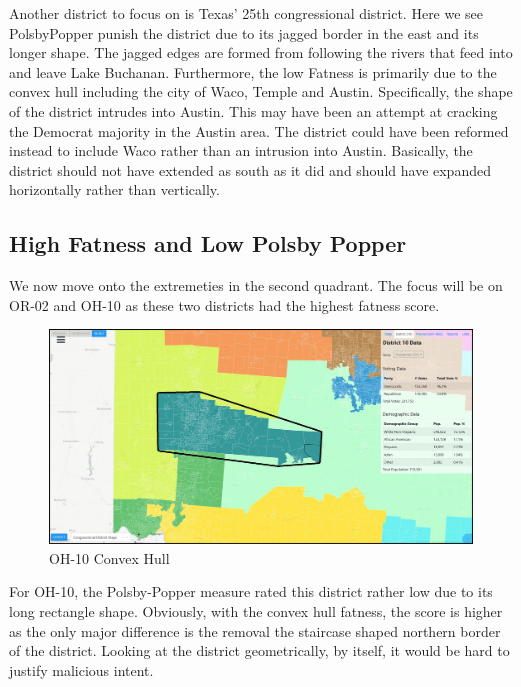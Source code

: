 \documentclass[letterpaper]{article}
\begin{document}
Another district to focus on is Texas' 25th congressional district. Here we see PolsbyPopper punish the district due to its jagged border in the east and its longer shape. The jagged edges are formed from following the rivers that feed into and leave Lake Buchanan. Furthermore, the low Fatness is primarily due to the convex hull including the city of Waco, Temple and Austin. Specifically, the shape of the district intrudes into Austin. This may have been an attempt at cracking the Democrat majority in the Austin area. The district could have been reformed instead to include Waco rather than an intrusion into Austin. Basically, the district should not have extended as south as it did and should have expanded horizontally rather than vertically.

\subsection{High Fatness and Low Polsby Popper}
We now move onto the extremeties in the second quadrant. The focus will be on OR-02 and OH-10 as these two districts had the highest fatness score.

\begin{figure}[H]
	\includegraphics[width=\linewidth]{./figures/OH-10-ConvexHull.png}
	\caption{OH-10 Convex Hull}
	\label{fig:oh10convexHull}
\end{figure}

For OH-10, the Polsby-Popper measure rated this district rather low due to its long rectangle shape. Obviously, with the convex hull fatness, the score is higher as the only major difference is the removal the staircase shaped northern border of the district. Looking at the district geometrically, by itself, it would be hard to justify malicious intent.
\end{document}
